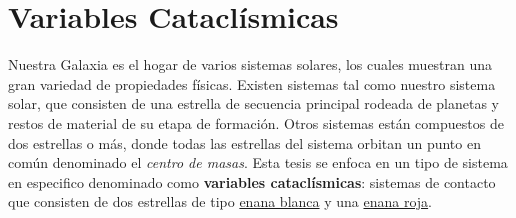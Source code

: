 \section{Variables Cataclísmicas}
Nuestra Galaxia es el hogar de varios sistemas solares, los cuales muestran una
gran variedad de propiedades físicas. Existen sistemas tal como nuestro sistema
solar, que consisten de una estrella de secuencia principal rodeada de planetas
y restos de material de su etapa de formación. Otros sistemas están compuestos
de dos estrellas o más, donde todas las estrellas del sistema orbitan un punto
en común denominado el \textit{centro de masas}. Esta tesis se enfoca en un tipo
de sistema en especifico denominado como \textbf{variables cataclísmicas}:
sistemas de contacto que consisten de dos estrellas de tipo
\hyperref[intro:sec:EnanaBlanca]{enana blanca} y una
\hyperref[intro:sec:EnanaRoja]{enana roja}.


